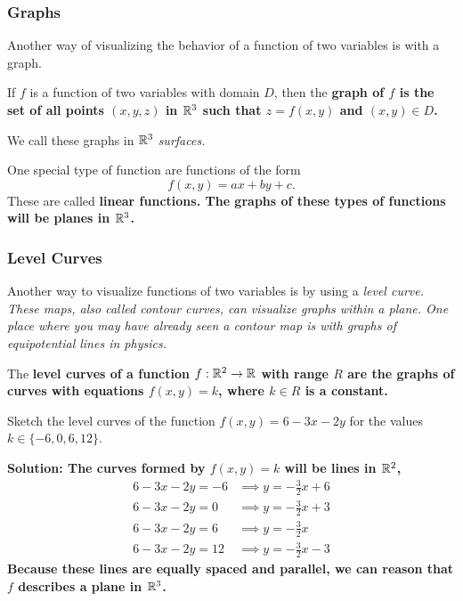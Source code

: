 \subsubsection{Graphs}
Another way of visualizing the behavior of a function of two variables is with a graph. 
\begin{definition}
    If \(f\) is a function of two variables with domain \(D\), then the \bf{graph} of \(f\) is the set of all points \((x,y,z)\) in \(\mathbb{R}^3\) such that \(z=f(x,y)\) and \((x,y)\in D\).
\end{definition}
We call these graphs in \(\mathbb{R}^3\) \it{surfaces}.\par
One special type of function are functions of the form
\[ f(x,y) = ax+by+c. \]
These are called \bf{linear functions}. The graphs of these types of functions will be planes in \(\mathbb{R}^3\).
\subsubsection{Level Curves}
Another way to visualize functions of two variables is by using a \it{level curve}. These maps, also called contour curves, can visualize graphs within a plane. One place where you may have already seen a contour map is with graphs of equipotential lines in physics.
\begin{definition}
    The \bf{level curves} of a function \(f: \mathbb{R}^2\to \mathbb{R}\) with range \(R\) are the graphs of curves with equations \(f(x,y)=k\), where \(k\in R\) is a constant. 
\end{definition}
\begin{example}
    Sketch the level curves of the function \(f(x,y)=6-3x-2y\) for the values \(k\in \{-6, 0, 6, 12\}\).\par\bf{Solution: }The curves formed by \(f(x,y)=k\) will be lines in \(\mathbb{R}^2\),
    \begin{align*}
        6-3x-2y=-6 &\implies y = -\frac{3}{2}x + 6 \\
        6-3x-2y=0 &\implies y = -\frac{3}{2}x + 3 \\
        6-3x-2y=6 &\implies y = -\frac{3}{2}x \\
        6-3x-2y=12 &\implies y = -\frac{3}{2}x-3
    \end{align*}
    Because these lines are equally spaced and parallel, we can reason that \(f\) describes a plane in \(\mathbb{R}^3\).
\end{example}
